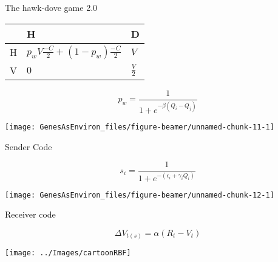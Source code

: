 \documentclass[
  ignorenonframetext,
]{beamer}
\begin{document}
\begin{frame}{The hawk-dove game 2.0}
\protect\hypertarget{the-hawk-dove-game-2.0}{}

\begin{center}
\begin{tabular}{ >{\centering\arraybackslash}p{1cm} | >{\centering\arraybackslash}p{4.5cm} | >{\centering\arraybackslash}p{4.5cm} }
& H & D \\ \hline
H & $p_w V\frac{-C}{2} + (1-p_w) \frac{-C}{2}$ & $V$ \\ \hline
V & $0$ & $\frac{V}{2}$\\
\end{tabular}
\end{center}

\begin{equation*}
p_w=\frac{1}{1+e^{-\beta(Q_i-Q_j)}}
\end{equation*}

\begin{center}\texttt{[image: GenesAsEnviron\_files/figure-beamer/unnamed-chunk-11-1]} \end{center}

\end{frame}

\begin{frame}{Sender Code}
\protect\hypertarget{sender-code}{}

\begin{equation*}
s_i = \frac{1}{1+e^{-(\epsilon_i+\gamma_iQ_i)}}
\label{eq:react_norm}
\end{equation*}

\begin{center}\texttt{[image: GenesAsEnviron\_files/figure-beamer/unnamed-chunk-12-1]} \end{center}

\end{frame}

\begin{frame}{Receiver code}
\protect\hypertarget{receiver-code}{}

\begin{equation*}
  \Delta V_{t(s)}=\alpha (R_t-V_t)
\end{equation*}

\begin{center}\texttt{[image: ../Images/cartoonRBF]} \end{center}

\end{frame}
\end{document}
